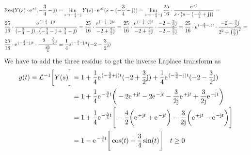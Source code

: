 \documentclass[11pt,a4paper,DIV=12]{scrartcl}
\begin{document}
\begin{align}
&	\mathrm{Res}(Y(s)\cdot\e^{st},-\frac{3}{4}-\im)=\lim\limits_{s\rightarrow -\frac{3}{4}-\im}Y(s)\cdot\e^{st}(s-(-\frac{3}{4}-\im))=\lim\limits_{s\rightarrow -\frac{3}{4}-\im}\frac{25}{16}\cdot\frac{\e^{st}}{s\cdot(s-(-\frac{3}{4}+\im))} = \nonumber \\
& \frac{25}{16}\cdot\frac{\e^{(-\frac{3}{4}-\im)t}}{(-\frac{3}{4}-\im)\cdot(-\frac{3}{4}-\im+\frac{3}{4}-\im)}=\frac{25}{16}\cdot\frac{\e^{(-\frac{3}{4}-\im)t}}{-2+\frac{3}{2}\im}=\frac{25}{16}\cdot\frac{\e^{(-\frac{3}{4}-\im)t}}{-2+\frac{3}{2}\im}\cdot\frac{-2-\frac{3}{2}\im}{-2-\frac{3}{2}\im}=\frac{25}{16}\cdot\e^{(-\frac{3}{4}-\im)t}\cdot\frac{-2-\frac{3}{2}\im}{2^2+\big (\frac{3}{2}\big)^2}=\nonumber \\
& \frac{25}{16}\cdot\e^{(-\frac{3}{4}-\im)t}\cdot\frac{-2-\frac{3}{2}\im}{\frac{25}{4}}=\frac{1}{4}\e^{(-\frac{3}{4}-\im)t}(-2-\frac{3}{2}\im)
\end{align}
We have to add the three residue to get the inverse Laplace transform as
\begin{align}
	y(t) = \mathcal{L}^{-1}\bigg [Y(s) \bigg]&=1+\frac{1}{4}\e^{(-\frac{3}{4}+\im)t}(-2+\frac{3}{2}\im)+\frac{1}{4}\e^{(-\frac{3}{4}-\im)t}(-2-\frac{3}{2}\im)\nonumber \\
	&=1+\frac{1}{4}\e^{-\frac{3}{4}t}\bigg (-2\e^{+\im t}-2\e^{-\im t}-\frac{3}{2\im}\e^{+\im t}+\frac{3}{2\im}\e^{-\im t}\bigg )\nonumber \\
	&= 1+\frac{1}{4}\e^{-\frac{3}{4}t}\Bigg [-\frac{4}{2}\bigg (\e^{+\im t}+\e^{-\im t}\bigg )-\frac{3}{2\im}\bigg (\e^{+\im t}-\e^{-\im t} \bigg )\Bigg ] \nonumber \\
	&=1-\e^{-\frac{3}{4}t}\Bigg [\cos(t)+\frac{3}{4}\sin(t) \Bigg ] \quad t \geq 0
\end{align}
\end{document}
